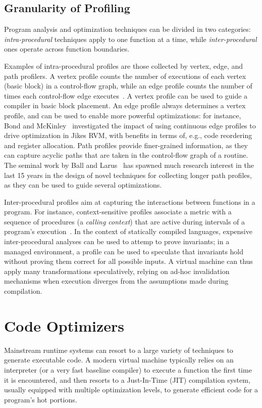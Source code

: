 \subsection*{Granularity of Profiling}

Program analysis and optimization techniques can be divided in two categories: {\em intra-procedural} techniques apply to one function at a time, while {\em inter-procedural} ones operate across function boundaries.

Examples of intra-procedural profiles are those collected by vertex, edge, and path profilers. A vertex profile counts the number of executions of each vertex (basic block) in a control-flow graph, while an edge profile counts the number of times each control-flow edge executes~\cite{Ball94}. A vertex profile can be used to guide a compiler in basic block placement. An edge profile always determines a vertex profile, and can be used to enable more powerful optimizations: for instance, Bond and McKinley~\cite{Bond05} investigated the impact of using continuous edge profiles to drive optimization in Jikes RVM, with benefits in terms of, e.g., code reordering and register allocation. Path profiles provide finer-grained information, as they can capture acyclic paths that are taken in the control-flow graph of a routine. The seminal work by Ball and Larus~\cite{Ball96} has spawned much research interest in the last 15 years in the design of novel techniques for collecting longer path profiles, as they can be used to guide several optimizations.

Inter-procedural profiles aim at capturing the interactions between functions in a program. For instance, context-sensitive profiles associate a metric with a sequence of procedures (a {\em calling context}) that are active during intervals of a program's execution~\cite{Ammons97}. In the context of statically compiled languages, expensive inter-procedural analyses can be used to attemp to prove invariants; in a managed environment, a profile can be used to speculate that invariants hold without proving them correct for all possible inputs. A virtual machine can thus apply many transformations speculatively, relying on ad-hoc invalidation mechanisms when execution diverges from the assumptions made during compilation.

\section{Code Optimizers}
Mainstream runtime systems can resort to a large variety of techniques to generate executable code. A modern virtual machine typically relies on an interpreter (or a very fast baseline compiler) to execute a function the first time it is encountered, and then resorts to a Just-In-Time (JIT) compilation system, usually equipped with multiple optimization levels, to generate efficient code for a program's hot portions.

